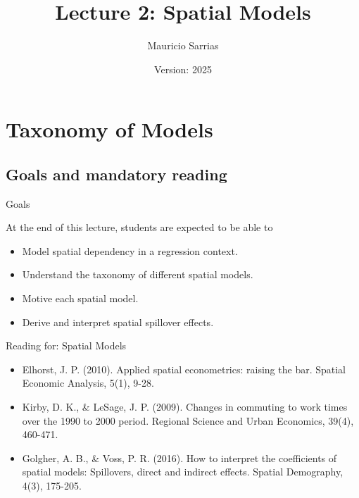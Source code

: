 \documentclass[english,10pt]{beamer}\usepackage[]{graphicx}\usepackage[]{xcolor}
\title{Lecture 2: Spatial Models}
\author{Mauricio Sarrias}
\institute{Universidad de Talca}
\date{Version: 2025}
\begin{document}
	
	\frame{\titlepage}
	
		
		
		\frame{\tableofcontents}
		
\section{Taxonomy of Models}

\subsection{Goals and mandatory reading}

\begin{frame}{Goals}
  \begin{alertblock}{At the end of this lecture, students are expected to be able to }
    \begin{itemize}
      \item Model spatial dependency in a regression context.
      \item Understand the taxonomy of different spatial models. 
      \item Motive each spatial model. 
      \item Derive and interpret spatial spillover effects. 
    \end{itemize}
  \end{alertblock}
\end{frame}

\begin{frame}{Reading for: Spatial Models}
    \begin{itemize}
      \item Elhorst, J. P. (2010). Applied spatial econometrics: raising the bar. Spatial Economic Analysis, 5(1), 9-28.
      \item Kirby, D. K., \& LeSage, J. P. (2009). Changes in commuting to work times over the 1990 to 2000 period. Regional Science and Urban Economics, 39(4), 460-471.
      \item Golgher, A. B., \& Voss, P. R. (2016). How to interpret the coefficients of spatial models: Spillovers, direct and indirect effects. Spatial Demography, 4(3), 175-205.
    \end{itemize}
\end{frame}
\end{document}
